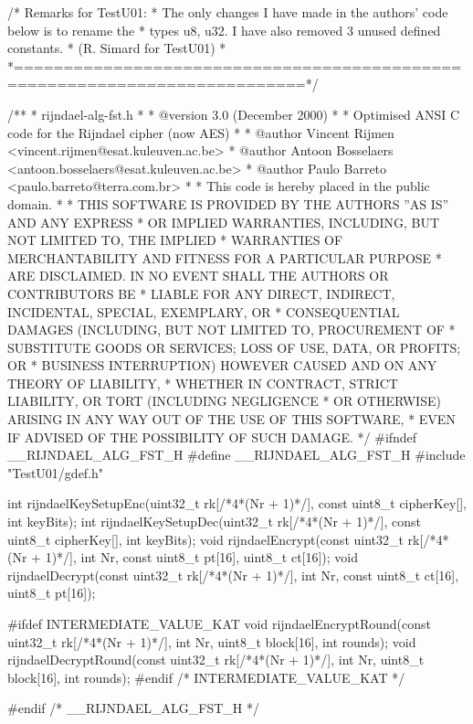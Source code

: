 \code
/*                       Remarks for TestU01:
 * The only changes I have made in the authors' code below is to rename the
 * types u8, u32. I have also removed 3 unused defined constants.
 * (R. Simard for TestU01)
 *
 *===========================================================================*/

/**
 * rijndael-alg-fst.h
 *
 * @version 3.0 (December 2000)
 *
 * Optimised ANSI C code for the Rijndael cipher (now AES)
 *
 * @author Vincent Rijmen <vincent.rijmen@esat.kuleuven.ac.be>
 * @author Antoon Bosselaers <antoon.bosselaers@esat.kuleuven.ac.be>
 * @author Paulo Barreto <paulo.barreto@terra.com.br>
 *
 * This code is hereby placed in the public domain.
 *
 * THIS SOFTWARE IS PROVIDED BY THE AUTHORS ''AS IS'' AND ANY EXPRESS
 * OR IMPLIED WARRANTIES, INCLUDING, BUT NOT LIMITED TO, THE IMPLIED
 * WARRANTIES OF MERCHANTABILITY AND FITNESS FOR A PARTICULAR PURPOSE
 * ARE DISCLAIMED.  IN NO EVENT SHALL THE AUTHORS OR CONTRIBUTORS BE
 * LIABLE FOR ANY DIRECT, INDIRECT, INCIDENTAL, SPECIAL, EXEMPLARY, OR
 * CONSEQUENTIAL DAMAGES (INCLUDING, BUT NOT LIMITED TO, PROCUREMENT OF
 * SUBSTITUTE GOODS OR SERVICES; LOSS OF USE, DATA, OR PROFITS; OR
 * BUSINESS INTERRUPTION) HOWEVER CAUSED AND ON ANY THEORY OF LIABILITY,
 * WHETHER IN CONTRACT, STRICT LIABILITY, OR TORT (INCLUDING NEGLIGENCE
 * OR OTHERWISE) ARISING IN ANY WAY OUT OF THE USE OF THIS SOFTWARE,
 * EVEN IF ADVISED OF THE POSSIBILITY OF SUCH DAMAGE.
 */
#ifndef __RIJNDAEL_ALG_FST_H
#define __RIJNDAEL_ALG_FST_H
#include "TestU01/gdef.h"


int rijndaelKeySetupEnc(uint32_t rk[/*4*(Nr + 1)*/], const uint8_t cipherKey[], int keyBits);
int rijndaelKeySetupDec(uint32_t rk[/*4*(Nr + 1)*/], const uint8_t cipherKey[], int keyBits);
void rijndaelEncrypt(const uint32_t rk[/*4*(Nr + 1)*/], int Nr, const uint8_t pt[16], uint8_t ct[16]);
void rijndaelDecrypt(const uint32_t rk[/*4*(Nr + 1)*/], int Nr, const uint8_t ct[16], uint8_t pt[16]);

#ifdef INTERMEDIATE_VALUE_KAT
void rijndaelEncryptRound(const uint32_t rk[/*4*(Nr + 1)*/], int Nr, uint8_t block[16], int rounds);
void rijndaelDecryptRound(const uint32_t rk[/*4*(Nr + 1)*/], int Nr, uint8_t block[16], int rounds);
#endif /* INTERMEDIATE_VALUE_KAT */

#endif /* __RIJNDAEL_ALG_FST_H */
\endcode
